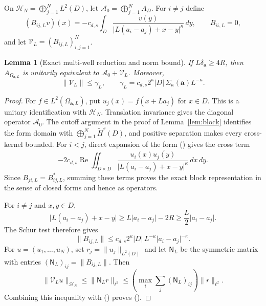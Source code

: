 \documentclass[twoside,10pt]{article}
\numberwithin{equation}{section}
\theoremstyle{slbody}
\newtheorem{lemma}[theorem]{Lemma}
\theoremstyle{definition}
\newcommand{\Hs}{\widetilde H^s}
\newcommand{\norm}[1]{\lVert #1\rVert}
\newcommand{\abs}[1]{\lvert #1\rvert}
\renewcommand{\eqref}[1]{%
  \textup{{\normalfont(\oldstylenums{\ref{#1}}}\normalfont)}}
\begin{document}
On $\mathcal H_N=\bigoplus_{j=1}^N L^2(D)$, let
$\mathcal A_0=\bigoplus_{j=1}^N A_D$.  For $i\ne j$ define
\begin{equation}\label{eq:multi-block}
 (B_{ij,L}v)(x)
 =-c_{d,s}\int_D
 \frac{v(y)}{\abs{L(a_i-a_j)+x-y}^{\kappa}}\,dy,
 \qquad B_{ii,L}=0,
\end{equation}
and let $\mathcal V_L=(B_{ij,L})_{i,j=1}^N$.

\begin{lemma}[Exact multi-well reduction and norm bound]
\label{lem:multi-block}
If $L\delta_{\mathbf a}\geq4R$, then $A_{\Omega_{\mathbf a,L}}$ is
unitarily equivalent to $\mathcal A_0+\mathcal V_L$.  Moreover,
\begin{equation}\label{eq:gamma-L}
 \norm{\mathcal V_L}\leq\gamma_L,
 \qquad
 \gamma_L
 =c_{d,s}2^\kappa\abs D\,\Sigma_\kappa(\mathbf a)L^{-\kappa}.
\end{equation}
\end{lemma}

\begin{proof}
For $f\in L^2(\Omega_{\mathbf a,L})$, put
$u_j(x)=f(x+La_j)$ for $x\in D$.  This is a unitary identification with
$\mathcal H_N$.  Translation invariance gives the diagonal operator
$\mathcal A_0$.  The cutoff argument in the proof of Lemma~\ref{lem:block}
identifies the form domain with $\bigoplus_{j=1}^N\Hs(D)$, and positive
separation makes every cross-kernel bounded.  For $i<j$, direct expansion of
the form
\eqref{eq:form} gives the cross term
\[
 -2c_{d,s}\operatorname{Re}\iint_{D\times D}
 \frac{u_i(x)\overline{u_j(y)}}
 {\abs{L(a_i-a_j)+x-y}^{\kappa}}\,dx\,dy.
\]
Since $B_{ji,L}=B_{ij,L}^*$, summing these terms proves the exact block
representation in the sense of closed forms and hence as operators.

For $i\ne j$ and $x,y\in D$,
\[
 \abs{L(a_i-a_j)+x-y}
 \geq L\abs{a_i-a_j}-2R
 \geq\frac L2\abs{a_i-a_j}.
\]
The Schur test therefore gives
\begin{equation}\label{eq:multi-block-norm}
 \norm{B_{ij,L}}
 \leq c_{d,s}2^\kappa\abs D\,
 L^{-\kappa}\abs{a_i-a_j}^{-\kappa}.
\end{equation}
For $u=(u_1,\dots,u_N)$, set $r_j=\norm{u_j}_{L^2(D)}$ and let
$\mathsf N_L$ be the symmetric matrix with entries
$(\mathsf N_L)_{ij}=\norm{B_{ij,L}}$.  Then
\[
 \norm{\mathcal V_Lu}_{\mathcal H_N}
 \leq\norm{\mathsf N_Lr}_{\ell^2}
 \leq\left(\max_i\sum_j(\mathsf N_L)_{ij}\right)\norm r_{\ell^2}.
\]
Combining this inequality with \eqref{eq:multi-block-norm} proves
\eqref{eq:gamma-L}.
\end{proof}
\end{document}
